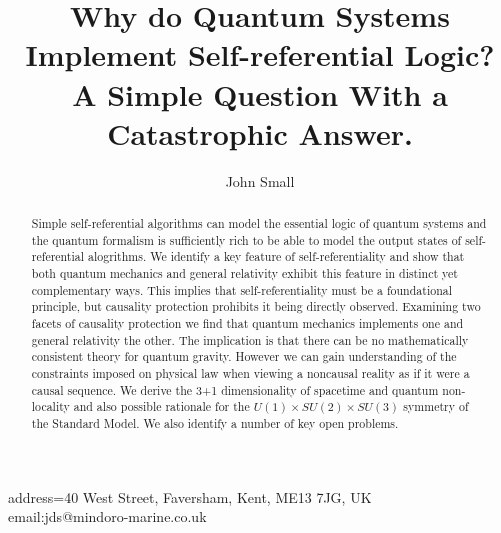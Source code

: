\documentclass[
   ,final            %
  ]
  {aipproc}
\begin{document}
\title[Quantum Systems \& Self-referentiality]{Why do Quantum Systems Implement Self-referential
Logic? A Simple Question With a Catastrophic Answer.}


\author{John Small}{
  address={40 West Street, Faversham, Kent, ME13 7JG, UK \\
  email:jds@mindoro-marine.co.uk}
}

\begin{abstract}
Simple self-referential algorithms can model the essential logic of quantum systems and the quantum formalism is sufficiently rich to be able to model %
the output states of
self-referential alogrithms. We identify a key feature of self-referentiality and show that both
quantum mechanics and general relativity exhibit this feature in distinct yet complementary ways. This implies
that self-referentiality must be a foundational principle, but causality protection prohibits it being directly
observed. Examining two facets of causality protection we find that quantum mechanics implements one and
general relativity the other. The implication is that there can be no mathematically consistent theory for quantum
gravity. However we can gain understanding of the constraints imposed on physical law when viewing a noncausal
reality as if it were a causal sequence. We derive the 3+1 dimensionality of spacetime and
quantum non-locality and also possible rationale for the $U(1) \times SU(2) \times SU(3)$ symmetry of the
Standard Model. We also identify a number of key open problems. 
\end{abstract}

\maketitle

\end{document}

